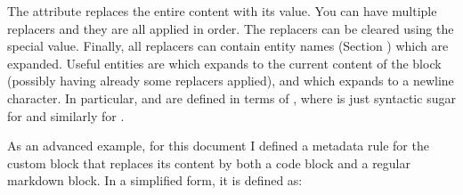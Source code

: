 \documentclass{book}
\begin{document}
\begin{mdP}[data-line={2825}]%
{}The %
{}%
{} attribute replaces the entire content with its value. You can
have multiple replacers and they are all applied in order. The replacers can
be cleared using the special %
{}%
{} value. Finally, all replacers can contain
entity names (Section%
{}{\mdNbsp}%
{}) which are expanded. Useful entities are
{}%
{} which expands to the current content of the block (possibly having
already some replacers applied), and %
{}%
{} which expands to a newline
character. In particular, %
{}%
{} and %
{}%
{} are defined in terms of
{}%
{}, where %
{}%
{}%
{}  is just syntactic sugar for
{}%
{}%
{}%
{} and similarly for %
{}%
{}.%
\end{mdP}%
\begin{mdP}[class={indent},data-line={2835}]%
{}As an advanced example, for this document I defined a metadata rule for  the
{}%
{} custom block that replaces its content by both a code block and a
regular markdown block. In a simplified form, it is defined as:%
\end{mdP}%
\end{document}
